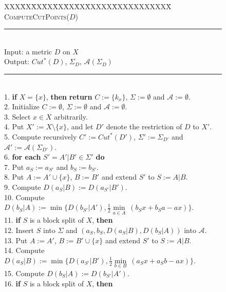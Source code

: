 \documentclass[12pt]{article}
\begin{document}
\begin{figure}
\begin{tabbing}
XXX\= XX\= XX\=  XX\= XX\= XX\= XX\=  XXXXX\=  XXXXXXXXXXX\= \kill \\
{\large \textsc{ComputeCutPoints}($D$)}\\
\rule{13cm}{0.5pt}\\
Input: \> \> \>a metric $D$ on $X$\\
Output: \> \> \>$Cut^*(D)$, \(\Sigma_D\), \(\mathcal{A}(\Sigma_D)\)\\
\rule{13cm}{0.5pt}\\
1. \> \textbf{if} \(X=\{x\}\), \textbf{then} \textbf{return} \(C:=\{k_x\}\),
      \(\Sigma := \emptyset\) and \(\mathcal{A}:=\emptyset\).\\
2. \> Initialize \(C := \emptyset\), \(\Sigma := \emptyset\) and \(\mathcal{A}:=\emptyset\).\\
3. \> Select \(x \in X\) arbitrarily.\\
4. \> Put \(X' := X \setminus \{x\}\), and let \(D'\) denote the restriction of \(D\) to \(X'\).\\
5. \> Compute recursively \(C' := Cut^*(D')\), \(\Sigma':=\Sigma_{D'}\) and \(\mathcal{A}' := \mathcal{A}(\Sigma_{D'})\).\\
6. \> \textbf{for each} \(S'=A'|B' \in \Sigma'\) \textbf{do}\\
7. \> \> Put \(a_S := a_{S'}\) and \(b_S := b_{S'}\).\\
8. \> \> Put \(A:= A' \cup \{x\}\), \(B := B'\) and extend \(S'\) to \(S := A|B\).\\
9. \> \> Compute \(D(a_S|B) := D(a_{S'}|B')\).\\
10. \> \> Compute \(D(b_S|A) := \min \{D(b_{S'}|A'), \frac{1}{2} \underset{a \in A}{\min} \ (b_Sx+b_Sa-ax) \}\).\\
11. \> \> \textbf{if} \(S\) is a block split of \(X\), \textbf{then}\\
12. \> \> \> Insert \(S\) into \(\Sigma\) and \((a_S,b_S,D(a_S|B),D(b_S|A))\) into \(\mathcal{A}\).\\
13. \> \> Put \(A:= A'\), \(B := B' \cup \{x\}\) and extend \(S'\) to \(S := A|B\).\\
14. \> \> Compute \(D(a_S|B) := \min \{D(a_{S'}|B'), \frac{1}{2} \underset{b \in B}{\min} \ (a_Sx+a_Sb-ax)\}\).\\
15. \> \> Compute \(D(b_S|A) := D(b_{S'}|A')\).\\
16. \> \> \textbf{if} \(S\) is a block split of \(X\), \textbf{then}\\ 

\end{tabbing}
\end{figure}
\end{document}
